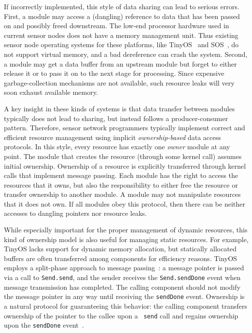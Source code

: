 If incorrectly implemented, this style of data sharing can lead to serious errors.
First, a module may access a (dangling) reference to data
that has been passed on and possibly freed downstream. 
%
The low-end processor hardware used in current sensor nodes does not
have a memory management unit.  Thus existing sensor node operating systems 
for these platforms,
like TinyOS~\cite{TinyOS} and SOS~\cite{sos}, do not support
virtual memory, and a bad dereference can crash the system. 
%
Second, a module may get a data buffer from an upstream module
but forget to either
release it or to pass it on to the next stage for processing.
Since expensive garbage-collection mechanisms are not available, such resource
leaks will very soon exhaust available memory.

A key insight in these kinds of systems is that data transfer between modules
typically does not lead to sharing, but instead follows a
producer-consumer pattern.  Therefore, sensor network
programmers typically implement correct and efficient resource
management using implicit {\em ownership-based} data access protocols.  In
this style, every resource has exactly one {\em
owner} module at any point.  The module that creates the resource
(through some kernel call) assumes initial ownership.  Ownership
of a resource is explicitly transferred through kernel calls that
implement message passing.
Each module has the
right to access the resources that it owns, but also the
responsibility to either free the resource or transfer ownership to
another module.  A module may not manipulate resources that it does
not own.  If all modules obey this protocol, then there can be neither
accesses to dangling pointers nor resource leaks.

While especially important for the proper management of dynamic
resources, this kind of ownership model is also useful for managing
static resources.  
For example, TinyOS lacks support for
dynamic memory allocation, but statically allocated buffers are often
transferred among components for efficiency reasons.
TinyOS employs a split-phase approach to message
passing~\cite{TinyOS}:
a message
pointer is passed via a call to {\tt Send.send}, and the sender
receives the {\tt Send.sendDone} event when message transmission has
completed.
The calling component should not
modify the message pointer in any way until receiving the {\tt sendDone}
event.  Ownership is a natural protocol for guaranteeing this
behavior:  the calling component transfers ownership of the pointer
to the callee upon a {\tt
  send} call and regains ownership upon the {\tt sendDone} event~\cite{ownershipthread}.


